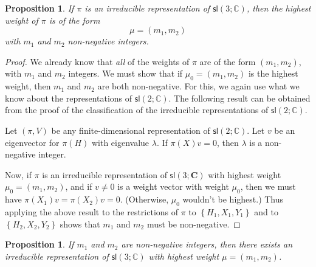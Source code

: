 \documentclass[12pt]{amsbook}
\theoremstyle{plain}
\newtheorem{proposition}[theorem]{Proposition}
\numberwithin{equation}{chapter}
\numberwithin{theorem}{chapter}
\begin{document}
\begin{proposition}
If $\pi$ is an irreducible representation of $\mathsf{sl}\left(
3;\mathbb{C}\right)  $, then the highest weight of $\pi$ is of the form
\[
\mu=(m_{1},m_{2})
\]
with $m_{1}$ and $m_{2}$ non-negative integers.
\end{proposition}

\begin{proof}
We already know that \textit{all} of the weights of $\pi$ are of the form
$(m_{1},m_{2})$, with $m_{1}$ and $m_{2}$ integers. We must show that if
$\mu_{0}=(m_{1},m_{2})$ is the highest weight, then $m_{1}$ and $m_{2}$ are
both non-negative. For this, we again use what we know about the
representations of $\mathsf{sl}(2;\mathbb{C})$. The following result can be
obtained from the proof of the classification of the irreducible
representations of $\mathsf{sl}(2;\mathbb{C})$.

Let $\left(  \pi,V\right)  $ be any finite-dimensional representation of
$\mathsf{sl}(2;\mathbb{C})$. Let $v$ be an eigenvector for $\pi(H)$ with
eigenvalue $\lambda$. If $\pi(X)v=0$, then $\lambda$ is a non-negative integer.

Now, if $\pi$ is an irreducible representation of $\mathsf{sl}\left(
3;\mathbf{C}\right)  $ with highest weight $\mu_{0}=(m_{1},m_{2})$, and if
$v\neq0$ is a weight vector with weight $\mu_{0}$, then we must have
$\pi(X_{1})v=\pi(X_{2})v=0$. (Otherwise, $\mu_{0}$ wouldn't be highest.) Thus
applying the above result to the restrictions of $\pi$ to $\left\{
H_{1},X_{1},Y_{1}\right\}  $ and to $\left\{  H_{2},X_{2},Y_{2}\right\}  $
shows that $m_{1}$ and $m_{2}$ must be non-negative.
\end{proof}

\begin{proposition}
If $m_{1}$ and $m_{2}$ are non-negative integers, then there exists an
irreducible representation of $\mathsf{sl}\left(  3;\mathbb{C}\right)  $ with
highest weight $\mu=(m_{1},m_{2})$.
\end{proposition}
\end{document}
